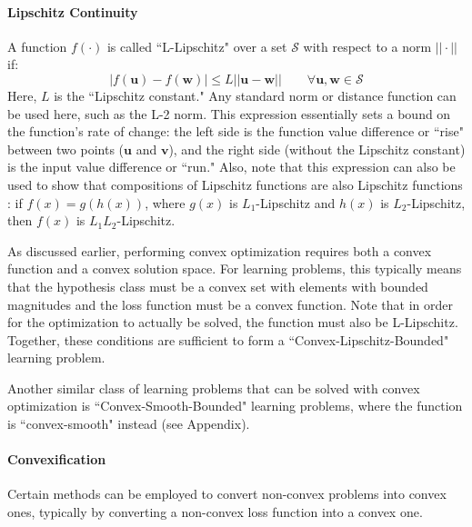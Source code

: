 \documentclass[11pt]{article}
\begin{document}
\paragraph{Lipschitz Continuity}
A function $f(\cdot)$ is called ``L-Lipschitz" over a set $\mathcal{S}$ with respect to a norm $|| \cdot ||$ if:
\begin{equation}
    \label{eq:lipschitz}
    |f(\boldsymbol{u}) - f(\boldsymbol{w})| \leq L || \boldsymbol{u} - \boldsymbol{w} || \quad \quad \forall \boldsymbol{u}, \boldsymbol{w} \in \mathcal{S}
\end{equation}
Here, $L$ is the ``Lipschitz constant." Any standard norm or distance function can be used here, such as the L-2 norm. This expression essentially sets a bound on the function's rate of change: the left side is the function value difference or ``rise" between two points ($\boldsymbol{u}$ and $\boldsymbol{v}$), and the right side (without the Lipschitz constant) is the input value difference or ``run." Also, note that this expression can also be used to show that compositions of Lipschitz functions are also Lipschitz functions \cite{wu2019convex}: if $f(x) = g(h(x))$, where $g(x)$ is $L_1$-Lipschitz and $h(x)$ is $L_2$-Lipschitz, then $f(x)$ is $L_1L_2$-Lipschitz.

As discussed earlier, performing convex optimization requires both a convex function and a convex solution space. For learning problems, this typically means that the hypothesis class must be a convex set with elements with bounded magnitudes and the loss function must be a convex function. Note that in order for the optimization to actually be solved, the function must also be L-Lipschitz. Together, these conditions are sufficient to form a ``Convex-Lipschitz-Bounded" learning problem. 

Another similar class of learning problems that can be solved with convex optimization is ``Convex-Smooth-Bounded" learning problems, where the function is ``convex-smooth" instead (see Appendix).

\paragraph{Convexification}
Certain methods can be employed to convert non-convex problems into convex ones, typically by converting a non-convex loss function into a convex one.
\end{document}
